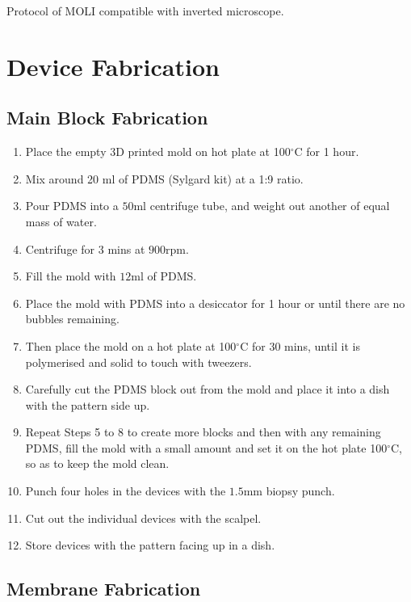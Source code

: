 Protocol of MOLI compatible with inverted microscope.

\section{Device Fabrication}

\subsection{Main Block Fabrication}

\begin{enumerate}
	  \setlength\itemsep{-0.1em}
	\item Place the empty 3D printed mold on hot plate at 100$^{\circ}$C for 1 hour.
	\item Mix around 20 ml of PDMS (Sylgard kit) at a 1:9 ratio. 
	\item Pour PDMS into a $50  \text{ml}$ centrifuge tube, and weight out another of equal mass of water.
	\item Centrifuge for 3 mins at $900  \text{rpm}$. 
	\item Fill the mold with $12  \text{ml}$ of PDMS.
	\item Place the mold with PDMS into a desiccator for 1 hour or until there are no bubbles remaining.
	\item Then place the mold on a hot plate at 100$^{\circ}$C for 30 mins, until it is polymerised and solid to touch with tweezers. 
	\item Carefully cut the PDMS block out from the mold and place it into a dish with the pattern side up.
	\item Repeat Steps 5 to 8 to create more blocks and then with any remaining PDMS, fill the mold with a small amount and set it on the hot plate 100$^{\circ}$C, so as to keep the mold clean.
	\item Punch four holes in the devices with the $1.5  \text{mm}$ biopsy punch.
	\item Cut out the individual devices with the scalpel.
	\item Store devices with the pattern facing up in a dish.
\end{enumerate}

\subsection{Membrane Fabrication}

